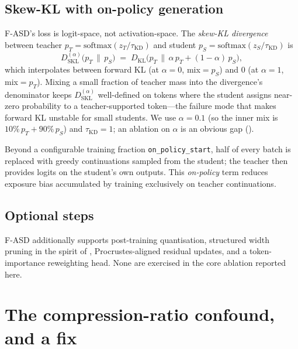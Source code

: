 \documentclass[11pt]{article}
\newcommand{\KL}{\ensuremath{D_{\mathrm{KL}}}}
\newcommand{\skl}[1]{\ensuremath{D_{\mathrm{SKL}}^{(#1)}}}
\newcommand{\fasd}{\textsc{F-ASD}}
\begin{document}
\subsection{Skew-KL with on-policy generation}
\label{sec:fasd:loss}

\fasd{}'s loss is logit-space, not activation-space. The
\emph{skew-KL divergence} \citep{Ko2024DistiLLM} between teacher
$p_T = \mathrm{softmax}(z_T/\tau_{\mathrm{KD}})$ and student
$p_S = \mathrm{softmax}(z_S/\tau_{\mathrm{KD}})$ is
\begin{equation}
\label{eq:skewkl}
\skl{\alpha}\!\big(p_T \,\big\|\, p_S\big)
\;=\; \KL\!\big(p_T \,\big\|\, \alpha\,p_T + (1-\alpha)\,p_S\big),
\end{equation}
which interpolates between forward KL (at $\alpha\!=\!0$, mix$=p_S$) and
$0$ (at $\alpha\!=\!1$, mix$=p_T$). Mixing a small fraction of teacher
mass into the divergence's denominator keeps $\skl{\alpha}$ well-defined
on tokens where the student assigns near-zero probability to a
teacher-supported token---the failure mode that makes forward KL
unstable for small students. We use $\alpha\!=\!0.1$ (so the inner
mix is $10\%\,p_T + 90\%\,p_S$) and $\tau_{\mathrm{KD}}\!=\!1$; an
ablation on $\alpha$ is an obvious gap ().

Beyond a configurable training fraction \texttt{on\_policy\_start}, half
of every batch is replaced with greedy continuations sampled from the
student; the teacher then provides logits on the student's own outputs.
This \emph{on-policy} term
\citep{Agarwal2024GKD} reduces exposure bias accumulated by training
exclusively on teacher continuations.

\subsection{Optional steps}
\label{sec:fasd:opt}

\fasd{} additionally supports post-training quantisation, structured
width pruning in the spirit of \citet{Sun2023Wanda}, Procrustes-aligned
residual updates, and a token-importance reweighting head. None are
exercised in the core ablation reported here.

\section{The compression-ratio confound, and a fix}
\label{sec:matched}
\end{document}
